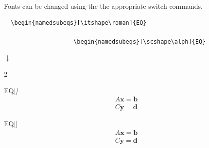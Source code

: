 \documentclass{article}
\begin{document}
Fonts can be changed using the the appropriate switch commands.
\begin{tcolorbox}
  \begin{verbatim}
  \begin{namedsubeqs}[\itshape\roman]{EQ}
  
                    \begin{namedsubeqs}[\scshape\alph]{EQ}
  \end{verbatim}
\begin{center}$\downarrow$\end{center}
\VTrg
\begin{multicols}{2}
    \begin{namedsubeqs}{EQ}[\itshape\roman]
    \begin{align}
      A\mathbf{x} = \mathbf{b}   \\
      C\mathbf{y} = \mathbf{d}
    \end{align}
    \end{namedsubeqs}
    \begin{namedsubeqs}{EQ}[\scshape\alph]
    \begin{align}
      A\mathbf{x} = \mathbf{b}   \\
      C\mathbf{y} = \mathbf{d}
    \end{align}
    \end{namedsubeqs}
  \end{multicols}
\end{tcolorbox}
\end{document}
